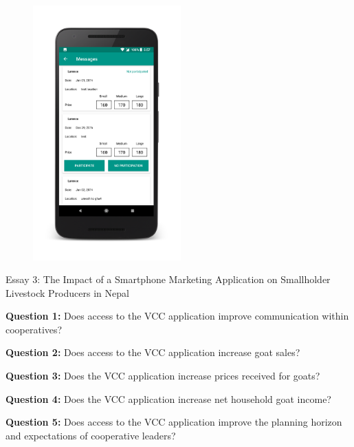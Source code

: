\documentclass[aspectratio=169]{beamer}
\newenvironment{wideitemize}{\itemize\addtolength{\itemsep}{10pt}}{\enditemize}
\begin{document}
\begin{frame}
\begin{figure}[!h]
\begin{minipage}{.2\textwidth}
    \includegraphics[width=5.7cm]{vcc3.png}
  \end{minipage}
\end{figure}
\end{frame}

\begin{frame}{Essay 3: The Impact of a Smartphone Marketing Application on Smallholder Livestock Producers in Nepal}
\begin{wideitemize}
    \item \textbf{Question 1:} Does access to the VCC application improve communication within cooperatives?
    \item \textbf{Question 2:} Does access to the VCC application increase goat sales?
    \item \textbf{Question 3:} Does the VCC application increase prices received for goats?
    \item \textbf{Question 4:} Does the VCC application increase net household goat income?
    \item \textbf{Question 5:} Does access to the VCC application improve the planning horizon and expectations of cooperative leaders?
\end{wideitemize}
\end{frame}
\end{document}
